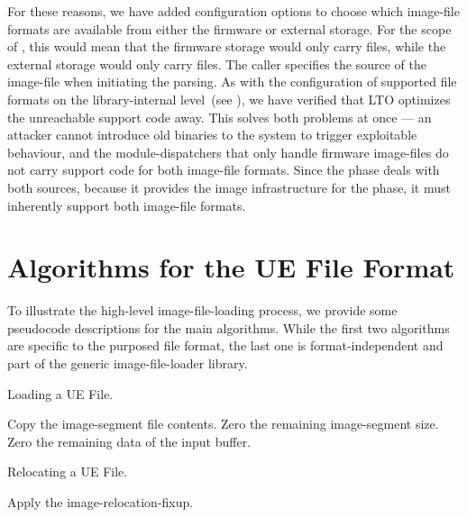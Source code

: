 For these reasons, we have added configuration options to choose which \gls{image-file} formats are available from either the \gls{firmware} or external storage. For the scope of , this would mean that the \gls{firmware} storage would only carry  files, while the external storage would only carry  files. The caller specifies the source of the \gls{image-file} when initiating the parsing. As with the configuration of supported file formats on the \gls{library}-internal level~(see ), we have verified that \gls{LTO} optimizes the unreachable support code away. This solves both problems at once --- an attacker cannot introduce old  binaries to the system to trigger exploitable behaviour, and the \glspl{module-dispatcher} that only handle \gls{firmware} \glspl{image-file} do not carry support code for both \gls{image-file} formats. Since the  phase deals with both sources, because it provides the image infrastructure for the  phase, it must inherently support both \gls{image-file} formats.

\pagebreak
\section{Algorithms for the UE File Format}
\label{sec:algorithms}

To illustrate the high-level \gls{image-file-loading} process, we provide some pseudocode descriptions for the main algorithms. While the first two algorithms are specific to the purposed  file format, the last one is format-independent and part of the generic \gls{image-file-loader} \gls{library}.

\begin{algorithm}
  \caption{Loading a UE File.}
  \label{algo:load}
  \begin{algorithmic}[1]
      \State Copy the \gls{image-segment} file contents.
      \State Zero the remaining \gls{image-segment} size.
    \EndFor
    \State Zero the remaining data of the input buffer.
  \end{algorithmic}
\end{algorithm}

\begin{algorithm}
  \caption{Relocating a UE File.}
  \label{algo:reloc}
  \begin{algorithmic}[1]
          \State Apply the \gls{image-relocation-fixup}.
        \EndFor
      \EndFor
    \EndFor
  \end{algorithmic}
\end{algorithm}

